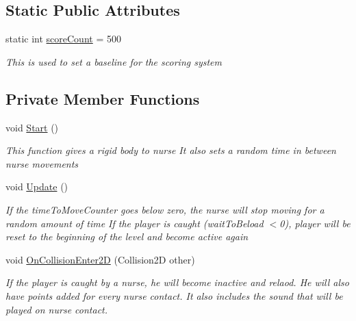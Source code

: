 \subsection*{Static Public Attributes}
\begin{DoxyCompactItemize}
\item 
static int \mbox{\hyperlink{class_nurse_controller_a02f9b6bcfd4d5082def13b1e69921b76}{score\+Count}} = 500
\begin{DoxyCompactList}\small\item\em This is used to set a baseline for the scoring system \end{DoxyCompactList}\end{DoxyCompactItemize}
\subsection*{Private Member Functions}
\begin{DoxyCompactItemize}
\item 
void \mbox{\hyperlink{class_nurse_controller_aa8fcc891957bbead5cfaa915045e3ded}{Start}} ()
\begin{DoxyCompactList}\small\item\em This function gives a rigid body to nurse It also sets a random time in between nurse movements \end{DoxyCompactList}\item 
void \mbox{\hyperlink{class_nurse_controller_a3c52dfb2cfa34450a3b0c379cbff1202}{Update}} ()
\begin{DoxyCompactList}\small\item\em If the time\+To\+Move\+Counter goes below zero, the nurse will stop moving for a random amount of time If the player is caught (wait\+To\+Beload $<$0), player will be reset to the beginning of the level and become active again \end{DoxyCompactList}\item 
void \mbox{\hyperlink{class_nurse_controller_a80a67354fb792c665c686f8b3ef4ba8d}{On\+Collision\+Enter2D}} (Collision2D other)
\begin{DoxyCompactList}\small\item\em If the player is caught by a nurse, he will become inactive and relaod. He will also have points added for every nurse contact. It also includes the sound that will be played on nurse contact. \end{DoxyCompactList}\end{DoxyCompactItemize}
